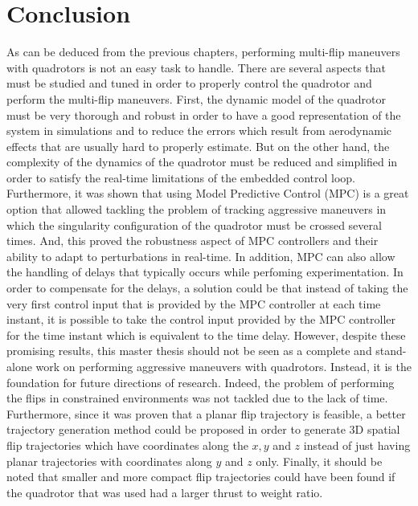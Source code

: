 \documentclass{thesisreport}
\begin{document}
\newpage 
 
 \chapter*{Conclusion}
 
 As can be deduced from the previous chapters, performing multi-flip maneuvers with quadrotors is not an easy task to handle. There are several aspects that must be studied and tuned in order to properly control the quadrotor and perform the multi-flip maneuvers. First, the dynamic model of the quadrotor must be very thorough and robust in order to have a good representation of the system in simulations and to reduce the errors which result from aerodynamic effects that are usually hard to properly estimate. But on the other hand, the complexity of the dynamics of the quadrotor must be reduced and simplified in order to satisfy the real-time limitations of the embedded control loop.
Furthermore, it was shown that using Model Predictive Control (MPC) is a great option that allowed tackling the problem of tracking aggressive maneuvers in which the singularity configuration of the quadrotor must be crossed several times. And, this proved the robustness aspect of MPC controllers and their ability to adapt to perturbations in real-time.
In addition, MPC can also allow the handling of delays that typically occurs while perfoming experimentation. In order to compensate for the delays, a solution could be that instead of taking the very first control input that is provided by the MPC controller at each time instant, it is possible to take the control input provided by the MPC controller for the time instant which is equivalent to the time delay.
However, despite these promising results, this master thesis should not be seen as a complete and stand-alone work on performing aggressive maneuvers with quadrotors. Instead, it is the foundation for future directions of research. 
Indeed, the problem of performing the flips in constrained environments was not tackled due to the lack of time. 
Furthermore, since it was proven that a planar flip trajectory is feasible, a better trajectory generation method could be proposed in order to generate 3D spatial flip trajectories which have coordinates along the $x,y$ and $z$ instead of just having planar trajectories with coordinates along $y$ and $z$ only. Finally, it should be noted that smaller and more compact flip trajectories could have been found if the quadrotor that was used had a larger thrust to weight ratio.
 
\end{document}
